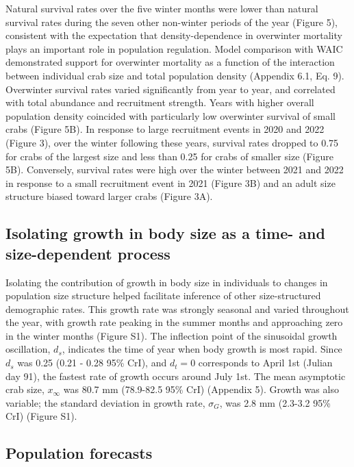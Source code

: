 \documentclass{article}
\begin{document}
Natural survival rates over the five winter months were lower than natural survival rates during the seven other non-winter periods of the year (Figure 5), consistent with the expectation that density-dependence in overwinter mortality plays an important role in population regulation. Model comparison with WAIC demonstrated support for overwinter mortality as a function of the interaction between individual crab size and total population density (Appendix 6.1, Eq. 9). Overwinter survival rates varied significantly from year to year, and correlated with total abundance and recruitment strength. Years with higher overall population density coincided with particularly low overwinter survival of small crabs (Figure 5B). In response to large recruitment events in 2020 and 2022 (Figure 3), over the winter following these years, survival rates dropped to 0.75 for crabs of the largest size and less than 0.25 for crabs of smaller size (Figure 5B). Conversely, survival rates were high over the winter between 2021 and 2022 in response to a small recruitment event in 2021 (Figure 3B) and an adult size structure biased toward larger crabs (Figure 3A). 

\subsection{Isolating growth in body size as a time- and size-dependent process}

Isolating the contribution of growth in body size in individuals to changes in population size structure helped facilitate inference of other size-structured demographic rates. This growth rate was strongly seasonal and varied throughout the year, with growth rate peaking in the summer months and approaching zero in the winter months (Figure S1). The inflection point of the sinusoidal growth oscillation, $d_s$, indicates the time of year when body growth is most rapid. Since $d_s$ was 0.25 (0.21 - 0.28 95\% CrI), and $d_t = 0$ corresponds to April 1st (Julian day 91), the fastest rate of growth occurs around July 1st. The mean asymptotic crab size, $x_{\infty}$ was 80.7 mm (78.9-82.5 95\% CrI) (Appendix 5). Growth was also variable; the standard deviation in growth rate, $\sigma_G$, was 2.8 mm (2.3-3.2 95\% CrI) (Figure S1).

\subsection{Population forecasts}
\end{document}
